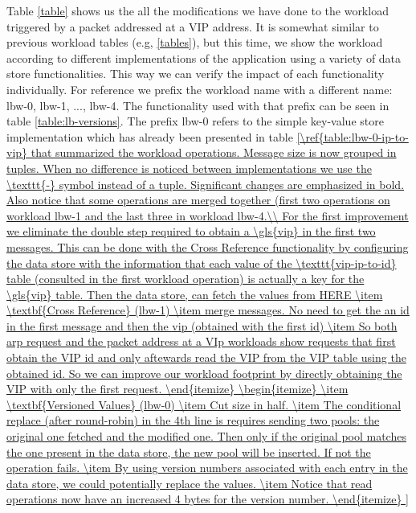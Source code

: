Table \ref{table} shows us the all the modifications we have done to
the workload triggered by a packet addressed at a \gls{VIP}
address. It is somewhat similar to previous workload tables (e.g,
\ref{tables}), but this time, we show the workload according to
different implementations of the application using a variety of data
store functionalities. This way we can verify the impact of each
functionality individually. For reference we prefix the workload name
with a different name: lbw-0, lbw-1, ..., lbw-4. The functionality
used with that prefix can be seen in table
\ref{table:lb-versions}. The prefix lbw-0 refers to the simple
key-value store implementation which has already been presented in
table \ref{\ref{table:lbw-0-ip-to-vip} that summarized  the workload 
operations. Message size is now grouped in tuples. When no difference is noticed between implementations we use the \texttt{-}
symbol instead of a tuple. Significant changes are emphasized in
bold. Also notice that some operations are merged together (first
two operations on workload lbw-1 and the last three in workload
lbw-4.\\ 

For the first improvement we eliminate the double step required to
obtain a \gls{vip} in the first two messages. This can be done with
the Cross Reference functionality by configuring the data store with
the information that each value of the \texttt{vip-ip-to-id} table
(consulted in the first workload operation) is actually a key for
the \gls{vip} table. Then the data store, can fetch the values from 
 HERE
\item \textbf{Cross Reference} (lbw-1) 
\item merge messages. No need to get the an id in the first
  message and then the vip (obtained with the first id) 
\item  So both arp request and the packet address at a VIp workloads show
requests that first obtain the VIP id and only aftewards read the VIP
from the VIP table using the obtained id. So we can improve our
workload footprint by directly obtaining the VIP with only the first
request. 
\end{itemize}

\begin{itemize}
\item \textbf{Versioned Values} (lbw-0)
\item Cut size in half. 
\item The conditional replace (after round-robin) in the 4th line is
  requires sending two pools: the original one fetched and the
  modified one.  Then only if the original pool matches the one
  present in the data store, the new pool will be inserted. If not the
  operation fails. 
\item By using version numbers associated with each entry in the data
  store, we could potentially replace the values. 
\item Notice that read operations now have an increased 4 bytes for
  the version number. 
\end{itemize}

}
